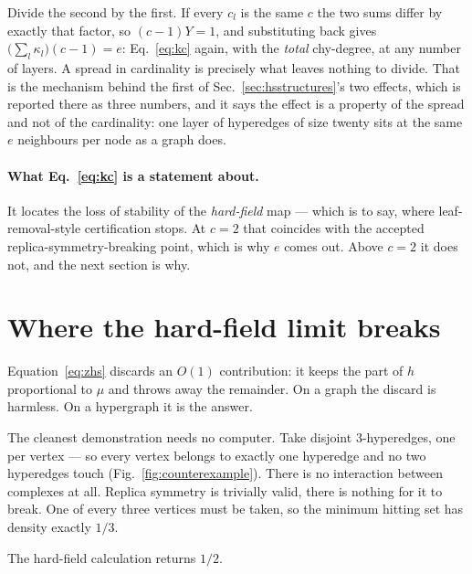 Divide the second by the first. If every $c_{l}$ is the same $c$ the two sums
differ by exactly that factor, so $(c-1)Y=1$, and substituting back gives
$\bigl(\sum_{l}\kappa_{l}\bigr)(c-1)=e$: Eq.~\eqref{eq:kc} again, with the
\emph{total} chy-degree, at any number of layers. A spread in cardinality is
precisely what leaves nothing to divide. That is the mechanism behind the first
of Sec.~\ref{sec:hsstructures}'s two effects, which is reported there as three
numbers, and it says the effect is a property of the spread and not of the
cardinality: one layer of hyperedges of size twenty sits at the same $e$
neighbours per node as a graph does.

\paragraph{What Eq.~\eqref{eq:kc} is a statement about.} It locates the loss of
stability of the \emph{hard-field} map --- which is to say, where
leaf-removal-style certification stops. At $c=2$ that coincides with the
accepted replica-symmetry-breaking point, which is why $e$ comes out. Above
$c=2$ it does not, and the next section is why.

\section{Where the hard-field limit breaks}
\label{sec:hardfail}

Equation~\eqref{eq:zhs} discards an $O(1)$ contribution: it keeps the part of
$h$ proportional to $\mu$ and throws away the remainder. On a graph the discard
is harmless. On a hypergraph it is the answer.

The cleanest demonstration needs no computer. Take disjoint $3$-hyperedges, one
per vertex --- so every vertex belongs to exactly one hyperedge and no two
hyperedges touch (Fig.~\ref{fig:counterexample}). There is no interaction
between complexes at all. Replica symmetry is trivially valid, there is nothing
for it to break. One of every three vertices must be taken, so the minimum
hitting set has density exactly $1/3$.

The hard-field calculation returns $1/2$.

